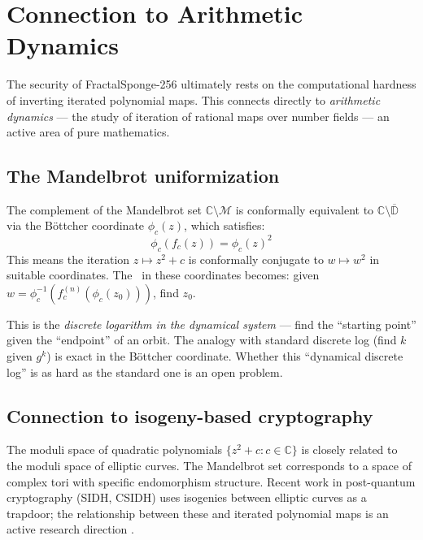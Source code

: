 \documentclass[11pt]{article}
\theoremstyle{definition}
\theoremstyle{remark}
\newcommand{\FIP}{\mathsf{FIP}}       %
\begin{document}
\section{Connection to Arithmetic Dynamics}
\label{sec:arith-dyn}

The security of FractalSponge-256 ultimately rests on the computational
hardness of inverting iterated polynomial maps. This connects directly to
\emph{arithmetic dynamics} --- the study of iteration of rational maps over
number fields --- an active area of pure mathematics.

\subsection{The Mandelbrot uniformization}

The complement of the Mandelbrot set $\mathbb{C} \setminus \mathcal{M}$ is
conformally equivalent to $\mathbb{C} \setminus \overline{\mathbb{D}}$ via
the B\"ottcher coordinate $\phi_c(z)$, which satisfies:
\[
    \phi_c(f_c(z)) = \phi_c(z)^2
\]
This means the iteration $z \mapsto z^2 + c$ is conformally conjugate to
$w \mapsto w^2$ in suitable coordinates. The \FIP\ in these coordinates
becomes: given $w = \phi_c^{-1}(f_c^{(n)}(\phi_c(z_0)))$, find $z_0$.

This is the \emph{discrete logarithm in the dynamical system} --- find the
``starting point'' given the ``endpoint'' of an orbit. The analogy with
standard discrete log (find $k$ given $g^k$) is exact in the B\"ottcher
coordinate. Whether this ``dynamical discrete log'' is as hard as the standard
one is an open problem.

\subsection{Connection to isogeny-based cryptography}

The moduli space of quadratic polynomials $\{z^2 + c : c \in \mathbb{C}\}$
is closely related to the moduli space of elliptic curves. The Mandelbrot set
corresponds to a space of complex tori with specific endomorphism structure.
Recent work in post-quantum cryptography (SIDH, CSIDH) uses isogenies between
elliptic curves as a trapdoor; the relationship between these and iterated
polynomial maps is an active research direction \cite{Silverman2007}.
\end{document}
